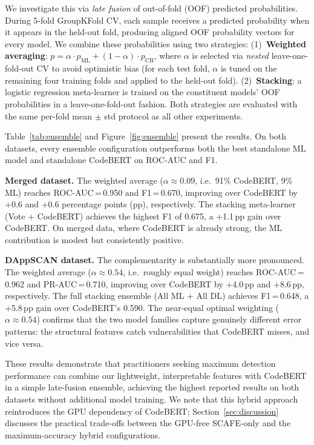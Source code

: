 \documentclass[11pt,a4paper]{article}
\newcommand{\MethodName}{SCAFE\xspace}
\begin{document}
We investigate this via \emph{late fusion} of out-of-fold (OOF) predicted probabilities.
During 5-fold GroupKFold CV, each sample receives a predicted probability when it appears in the held-out fold, producing aligned OOF probability vectors for every model.
We combine these probabilities using two strategies:
(1)~\textbf{Weighted averaging}: $p = \alpha \cdot p_{\text{ML}} + (1 - \alpha) \cdot p_{\text{CB}}$, where $\alpha$ is selected via \emph{nested} leave-one-fold-out CV to avoid optimistic bias (for each test fold, $\alpha$ is tuned on the remaining four training folds and applied to the held-out fold).
(2)~\textbf{Stacking}: a logistic regression meta-learner is trained on the constituent models' OOF probabilities in a leave-one-fold-out fashion.
Both strategies are evaluated with the same per-fold mean $\pm$ std protocol as all other experiments.

Table~\ref{tab:ensemble} and Figure~\ref{fig:ensemble} present the results.
On both datasets, every ensemble configuration outperforms both the best standalone ML model and standalone CodeBERT on ROC-AUC and F1.

\textbf{Merged dataset.}
The weighted average ($\alpha \approx 0.09$, i.e.\ 91\% CodeBERT, 9\% ML) reaches ROC-AUC\,=\,0.950 and F1\,=\,0.670, improving over CodeBERT by +0.6 and +0.6 percentage points (pp), respectively.
The stacking meta-learner (Vote + CodeBERT) achieves the highest F1 of 0.675, a +1.1\,pp gain over CodeBERT.
On merged data, where CodeBERT is already strong, the ML contribution is modest but consistently positive.

\textbf{DAppSCAN dataset.}
The complementarity is substantially more pronounced.
The weighted average ($\alpha \approx 0.54$, i.e.\ roughly equal weight) reaches ROC-AUC\,=\,0.962 and PR-AUC\,=\,0.710, improving over CodeBERT by +4.0\,pp and +8.6\,pp, respectively.
The full stacking ensemble (All ML + All DL) achieves F1\,=\,0.648, a +5.8\,pp gain over CodeBERT's 0.590.
The near-equal optimal weighting ($\alpha \approx 0.54$) confirms that the two model families capture genuinely different error patterns: the structural features catch vulnerabilities that CodeBERT misses, and vice versa.

These results demonstrate that practitioners seeking maximum detection performance can combine our lightweight, interpretable features with CodeBERT in a simple late-fusion ensemble, achieving the highest reported results on both datasets without additional model training.
We note that this hybrid approach reintroduces the GPU dependency of CodeBERT; Section~\ref{sec:discussion} discusses the practical trade-offs between the GPU-free \MethodName-only and the maximum-accuracy hybrid configurations.
\end{document}
